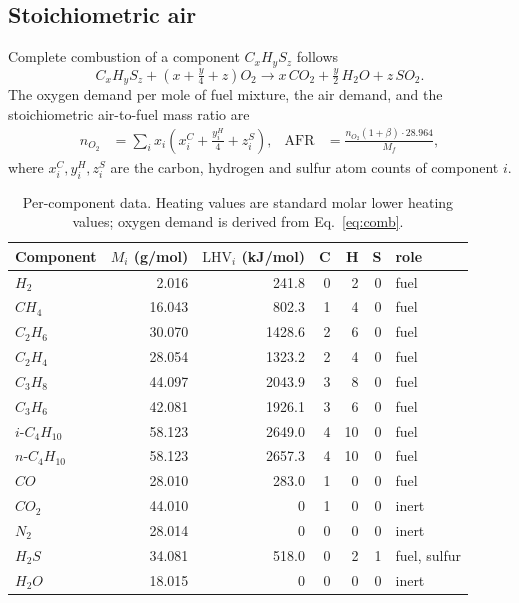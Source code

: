 \documentclass[11pt,a4paper]{article}
\begin{document}
\subsection{Stoichiometric air}
Complete combustion of a component $C_xH_yS_z$ follows
\begin{equation}
C_xH_yS_z + \left(x+\tfrac{y}{4}+z\right)O_2 \longrightarrow
x\,CO_2 + \tfrac{y}{2}\,H_2O + z\,SO_2 .
\label{eq:comb}
\end{equation}
The oxygen demand per mole of fuel mixture, the air demand, and the
stoichiometric air-to-fuel mass ratio are
\begin{align}
n_{O_2} &= \sum_i x_i\left(x_i^{C}+\tfrac{y_i^{H}}{4}+z_i^{S}\right), &
\mathrm{AFR} &= \frac{n_{O_2}(1+\beta)\cdot 28.964}{M_f},
\end{align}
where $x_i^{C},y_i^{H},z_i^{S}$ are the carbon, hydrogen and sulfur atom counts of
component $i$.

\begin{table}[h]
\centering\small
\caption{Per-component data. Heating values are standard molar lower heating
values; oxygen demand is derived from Eq.~\eqref{eq:comb}.}
\label{tab:comp}
\begin{tabular}{@{}lrrrrrl@{}}
\toprule
Component & $M_i$ (\si{g/mol}) & $\mathrm{LHV}_i$ (\si{kJ/mol}) & C & H & S & role\\
\midrule
$H_2$      & 2.016 & 241.8 & 0 & 2 & 0 & fuel\\
$CH_4$     & 16.043 & 802.3 & 1 & 4 & 0 & fuel\\
$C_2H_6$   & 30.070 & 1428.6 & 2 & 6 & 0 & fuel\\
$C_2H_4$   & 28.054 & 1323.2 & 2 & 4 & 0 & fuel\\
$C_3H_8$   & 44.097 & 2043.9 & 3 & 8 & 0 & fuel\\
$C_3H_6$   & 42.081 & 1926.1 & 3 & 6 & 0 & fuel\\
$i\text{-}C_4H_{10}$ & 58.123 & 2649.0 & 4 & 10 & 0 & fuel\\
$n\text{-}C_4H_{10}$ & 58.123 & 2657.3 & 4 & 10 & 0 & fuel\\
$CO$       & 28.010 & 283.0 & 1 & 0 & 0 & fuel\\
$CO_2$     & 44.010 & 0 & 1 & 0 & 0 & inert\\
$N_2$      & 28.014 & 0 & 0 & 0 & 0 & inert\\
$H_2S$     & 34.081 & 518.0 & 0 & 2 & 1 & fuel, sulfur\\
$H_2O$     & 18.015 & 0 & 0 & 0 & 0 & inert\\
\bottomrule
\end{tabular}
\end{table}
\end{document}
